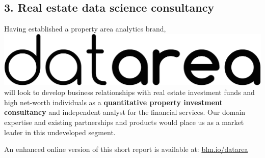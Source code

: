 \documentclass[
10pt, %
a4paper, %
oneside, %
headinclude,footinclude, %
BCOR5mm, %
]{scrartcl}
\newcommand*{\logo}{\includegraphics[scale=.04]{Figures/logotext.png}}
\begin{document}
\subsection*{3. Real estate data science consultancy}

Having established a property area analytics brand, \logo\hspace{.1em}
will look to develop business relationships with real estate
investment funds and high net-worth individuals as a {\bf quantitative
  property investment consultancy} and independent analyst for the
financial services. Our domain expertise and existing partnerships and
products would place us as a market leader in this undeveloped
segment.


\vspace{1em}
\begin{flushright} {\small An enhanced online version of this short
    report is available at:
    \leavevmode\href{http://blm.io/datarea}{blm.io/datarea}}
\end{flushright}
\end{document}
